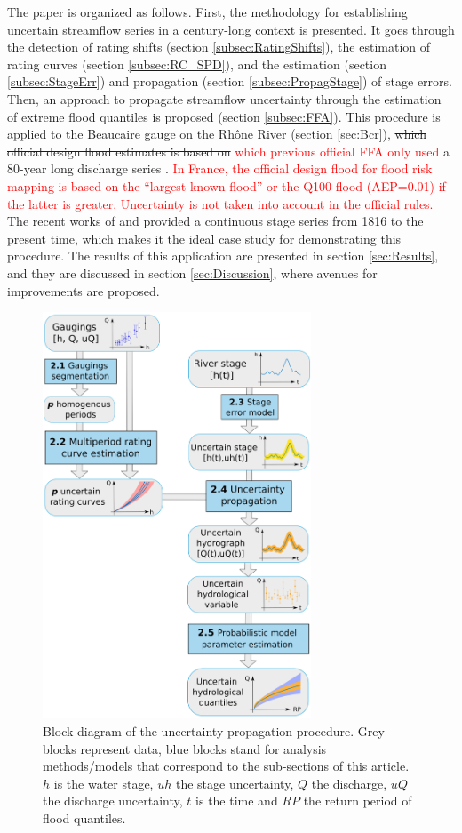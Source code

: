 \documentclass[11pt]{article}
\begin{document}
    The paper is organized as follows. First, the methodology for establishing uncertain streamflow series in a century-long context is presented. It goes through the detection of rating shifts (section \ref{subsec:RatingShifts}), the estimation of rating curves (section \ref{subsec:RC_SPD}), and the estimation (section \ref{subsec:StageErr}) and propagation (section \ref{subsec:PropagStage}) of stage errors. Then, an approach to propagate streamflow uncertainty through the estimation of extreme flood quantiles is proposed (section \ref{subsec:FFA}). This procedure is applied to the Beaucaire gauge on the Rhône River (section \ref{sec:Bcr}), \sout{which official design flood estimates is based on} \textcolor{red}{which previous official FFA only used} a 80-year long discharge series \citep{rigaudiere_etude_2000}. \textcolor{red}{In France, the official design flood for flood risk mapping is based on the “largest known flood” or the Q100 flood (AEP=0.01) if the latter is greater. Uncertainty is not taken into account in the official rules.} The recent works of \citet{pichard_hydro-climatology_2017} and \citet{bard_actualisation_2018} provided a continuous stage series from 1816 to the present time, which makes it the ideal case study for demonstrating this procedure. The results of this application are presented in section \ref{sec:Results}, and they are discussed in section \ref{sec:Discussion}, where avenues for improvements are proposed.
    
    \begin{figure}[h!]
    \centering
        \includegraphics[width = 8cm]{Figs/1-uTotSchema.png}
        \caption{Block diagram of the uncertainty propagation procedure. Grey blocks represent data, blue blocks stand for analysis methods/models that correspond to the sub-sections of this article. $h$ is the water stage, $uh$ the stage uncertainty, $Q$ the discharge, $uQ$ the discharge uncertainty, $t$ is the time and $RP$ the return period of flood quantiles.}
        \label{fig:ChProp}
    \end{figure}
    \FloatBarrier
    
\end{document}
